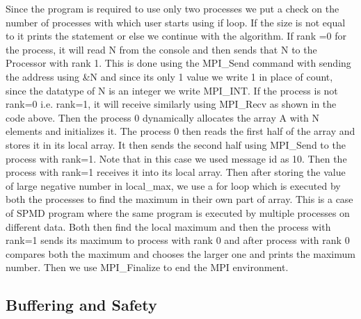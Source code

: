\documentclass[12pt]{book}
\begin{document}
Since the program is required to use only two processes we put a check on the number of processes with which user starts using if loop. If the size is not equal to it prints the statement or else we continue with the algorithm. If rank =0 for the process, it will read N from the console and then sends that N to the Processor with rank 1. This is done using the MPI\_Send command with sending the address using \&N and since its only 1 value we write 1 in place of count, since the datatype of N is an integer we write MPI\_INT. If the process is not rank=0 i.e. rank=1, it will receive similarly using MPI\_Recv as shown in the code above. Then the process 0 dynamically allocates the array A with N elements and initializes it. The process 0 then reads the first half of the array and stores it in its local array. It then sends the second half using MPI\_Send to the process with rank=1. Note that in this case we used message id as 10. Then the process with rank=1 receives it into its local array. 
Then after storing the value of large negative number in local\_max, we use a for loop which is executed by both the processes to find the maximum in their own part of array. This is a case of SPMD program where the same program is executed by multiple processes on different data. Both then find the local maximum and then the process with rank=1 sends its maximum to process with rank 0 and after process with rank 0 compares both the maximum and chooses the larger one and prints the maximum number. Then we use MPI\_Finalize to end the MPI environment.

\subsection{Buffering and Safety}
\end{document}
